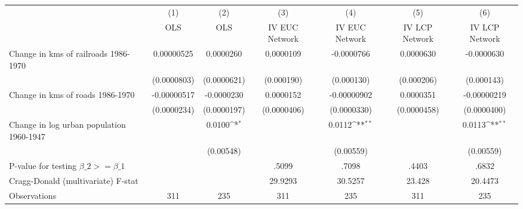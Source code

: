 {
\def\sym#1{\ifmmode^{#1}\else\(^{#1}\)\fi}
\begin{tabular}{l*{6}{c}}
\hline\hline
                &\multicolumn{1}{c}{(1)}&\multicolumn{1}{c}{(2)}&\multicolumn{1}{c}{(3)}&\multicolumn{1}{c}{(4)}&\multicolumn{1}{c}{(5)}&\multicolumn{1}{c}{(6)}\\
                &\multicolumn{1}{c}{OLS}&\multicolumn{1}{c}{OLS}&\multicolumn{1}{c}{IV EUC Network}&\multicolumn{1}{c}{IV EUC Network}&\multicolumn{1}{c}{IV LCP Network}&\multicolumn{1}{c}{IV LCP Network}\\
\hline
Change in kms of railroads 1986-1970&0.00000525         &0.0000260         &0.0000109         &-0.0000766         &0.0000630         &-0.0000630         \\
                &(0.0000803)         &(0.0000621)         &(0.000190)         &(0.000130)         &(0.000206)         &(0.000143)         \\
[1em]
Change in kms of roads 1986-1970&-0.00000517         &-0.0000230         &0.0000152         &-0.00000902         &0.0000351         &-0.00000219         \\
                &(0.0000234)         &(0.0000197)         &(0.0000406)         &(0.0000330)         &(0.0000458)         &(0.0000400)         \\
[1em]
Change in log urban population 1960-1947&                  &   0.0100\sym{*}  &                  &   0.0112\sym{**} &                  &   0.0113\sym{**} \\
                &                  &(0.00548)         &                  &(0.00559)         &                  &(0.00559)         \\
\hline
P-value for testing $\beta\_{2} >= \beta\_{1}$&                  &                  &    .5099         &    .7098         &    .4403         &    .6832         \\
Cragg-Donald (multivariate) F-stat&                  &                  &  29.9293         &  30.5257         &   23.428         &  20.4473         \\
Observations    &      311         &      235         &      311         &      235         &      311         &      235         \\
\hline\hline
\end{tabular}
}
